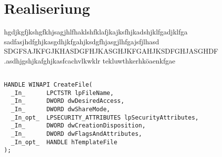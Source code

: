 \chapter{Realiseriung}
hgdjkgfjkshgfkhjsagjhlfhaklshfklafjkajksfhjkadshjklfgadjklfga
sadfasjhdfghjkasgdhjkfgahjksdgfhjasgjlhfgajsfjlhasd
SDGFSAJKFGJKHASDGFHJKASGHJKFGAHJKSDFGHJASGHDF
.asdhjgshjkafghjkasfcachvlkwklr tekluwthkerhköaenkfgae


\begin{lstlisting}	

HANDLE WINAPI CreateFile(
  _In_      LPCTSTR lpFileName,
  _In_      DWORD dwDesiredAccess,
  _In_      DWORD dwShareMode,
  _In_opt_  LPSECURITY_ATTRIBUTES lpSecurityAttributes,
  _In_      DWORD dwCreationDisposition,
  _In_      DWORD dwFlagsAndAttributes,
  _In_opt_  HANDLE hTemplateFile
);

\end{lstlisting}
